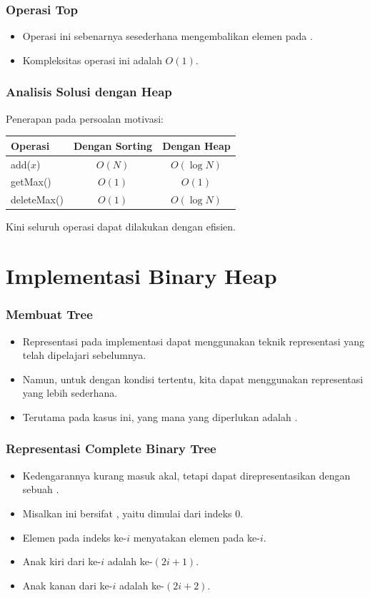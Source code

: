 \begin{frame}
\frametitle{Operasi Top}
\begin{itemize}
  \item Operasi ini sebenarnya sesederhana mengembalikan elemen pada  \pbinaryHeap.
  \item Kompleksitas operasi ini adalah $O(1)$.
\end{itemize}
\end{frame}

\begin{frame}
\frametitle{Analisis Solusi dengan Heap}
Penerapan \pheap pada persoalan motivasi:
\begin{table}[ht]
  \begin{tabular}{|l|c|c|}
    \hline Operasi  & Dengan Sorting & Dengan Heap \\
    \hline  add($x$) & $O(N)$ & $O(\log{N})$\\
    \hline  getMax() & $O(1)$ & $O(1)$\\
    \hline  deleteMax() & $O(1)$ & $O(\log{N})$\\
    \hline
  \end{tabular}
\end{table}  

Kini seluruh operasi dapat dilakukan dengan efisien.
\end{frame}

\section{Implementasi Binary Heap}
\frame{\sectionpage}

\begin{frame}
\frametitle{Membuat Tree}
\begin{itemize}
  \item Representasi \ftree pada implementasi dapat menggunakan teknik representasi \fgraph yang telah dipelajari sebelumnya.
  \item Namun, untuk \ftree dengan kondisi tertentu, kita dapat menggunakan representasi yang lebih sederhana.
  \item Terutama pada kasus ini, yang mana \ftree yang diperlukan adalah .
\end{itemize}
\end{frame}

\begin{frame}
\frametitle{Representasi Complete Binary Tree}
\begin{itemize}
  \item Kedengarannya kurang masuk akal, tetapi  dapat direpresentasikan dengan sebuah \farray.
  \item Misalkan \farray ini bersifat , yaitu dimulai dari indeks 0.
  \item Elemen pada indeks ke-$i$ menyatakan elemen pada \fnode ke-$i$.
  \item Anak kiri dari \fnode ke-$i$ adalah \fnode ke-$(2i+1)$. 
  \item Anak kanan dari \fnode ke-$i$ adalah \fnode ke-$(2i+2)$. 
\end{itemize}
\end{frame}

